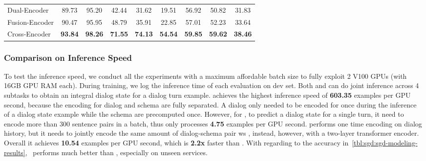\begin{table}[!t]
\begin{center}
{\begin{tabular}{l|ccccc|ccc}
  Dual-Encoder                 & 89.73                      & 95.20       & 42.44                          & 31.62       & 19.51       & 56.92       & 50.82       & 31.83       \\
  Fusion-Encoder               & 90.47                      & 95.95       & 48.79                          & 35.91       & 22.85       & 57.01       & 52.23       & 33.64       \\
  Cross-Encoder                & {\bf 93.84}                & {\bf 98.26} & {\bf 71.55}                    & {\bf 74.13} & {\bf 54.54} & {\bf 59.85} & {\bf 59.62} & {\bf 38.46} \\ \hline
  \bottomrule
\end{tabular}}
\end{center}
\end{table}

\subsubsection{Comparison on Inference Speed}
\label{sssec:sgd:infer-speed}
To test the inference speed, we conduct all the experiments with a
maximum affordable batch size to fully exploit 2 V100 GPUs (with 16GB
GPU RAM each). During training, we log the inference time of each
evaluation on dev set. Both \DE and \FE can do joint inference across
4 subtasks to obtain an integral dialog state for a dialog turn
example. \DE achieves the highest inference speed of {\bf 603.35}
examples per GPU second, because the encoding for dialog and schema
are fully separated. A dialog only needed to be encoded for once
during the inference of a dialog state example while the schema are
precomputed once. However, for \CE, to predict a dialog state for a
single turn, it need to encode more than 300 sentence pairs in a
batch, thus only processes {\bf 4.75} examples per GPU second. \FE
performs one time encoding on dialog history, but it needs to jointly
encode the same amount of dialog-schema pair ws \CE, instead, however,
with a two-layer transformer encoder. Overall it achieves {\bf 10.54}
examples per GPU second, which is {\bf 2.2x} faster than \CE. With
regarding to the accuracy in~\autoref{tbl:sgd:sgd-modeling-results},
\FE~performs much better than \DE, especially on unseen services.

